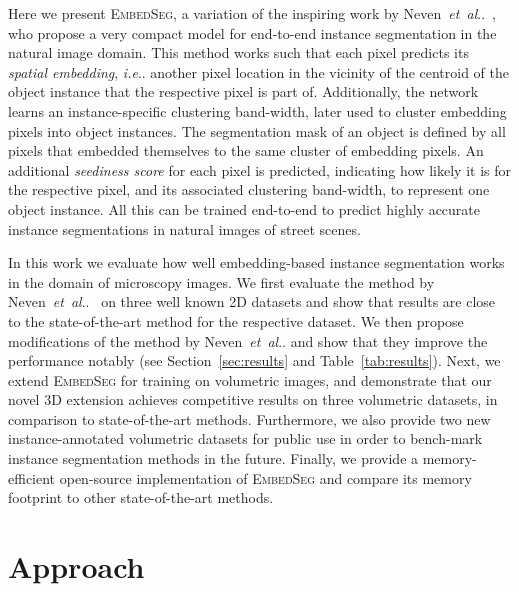 \documentclass{midl} %
\makeatletter
\newcommand{\EmbedSeg}{\mbox{\textsc{EmbedSeg}}\xspace}
\DeclareRobustCommand\onedot{\futurelet\@let@token\@onedot}
\def\@onedot{\ifx\@let@token.\else.\null\fi\xspace}
\def\ie{\emph{i.e}\onedot} \def\Ie{\emph{I.e}\onedot}
\def\etal{\emph{et~al}\onedot}
\makeatother
\begin{document}
Here we present \EmbedSeg, a variation of the inspiring work by Neven~\etal~\cite{neven2019}, who propose a very compact model for end-to-end instance segmentation in the natural image domain.
This method works such that each pixel predicts its \textit{spatial embedding}, \ie another pixel location in the vicinity of the centroid of the object instance that the respective pixel is part of. 
Additionally, the network learns an instance-specific clustering band-width, later used to cluster embedding pixels into object instances. 
The segmentation mask of an object is defined by all pixels that embedded themselves to the same cluster of embedding pixels.
An additional \textit{seediness score} for each pixel is predicted, indicating how likely it is for the respective pixel, and its associated clustering band-width, to represent one object instance. 
All this can be trained end-to-end to predict highly accurate instance segmentations in natural images of street scenes.

In this work we evaluate how well embedding-based instance segmentation works in the domain of microscopy images.
We first evaluate the method by Neven~\etal~\cite{neven2019} on three well known 2D datasets and show that results are close to the state-of-the-art method for the respective dataset.
We then propose modifications of the method by Neven~\etal and show that they improve the performance notably (see Section~\ref{sec:results} and Table~\ref{tab:results}).
Next, we extend \EmbedSeg for training on volumetric images, and demonstrate that our novel 3D extension achieves competitive results on three volumetric datasets, in comparison to state-of-the-art methods.
Furthermore, we also provide two new instance-annotated volumetric datasets for public use in order to bench-mark instance segmentation methods in the future.
Finally, we provide a memory-efficient open-source implementation of \EmbedSeg and compare its memory footprint to other state-of-the-art methods.

\section{Approach}




\end{document}
